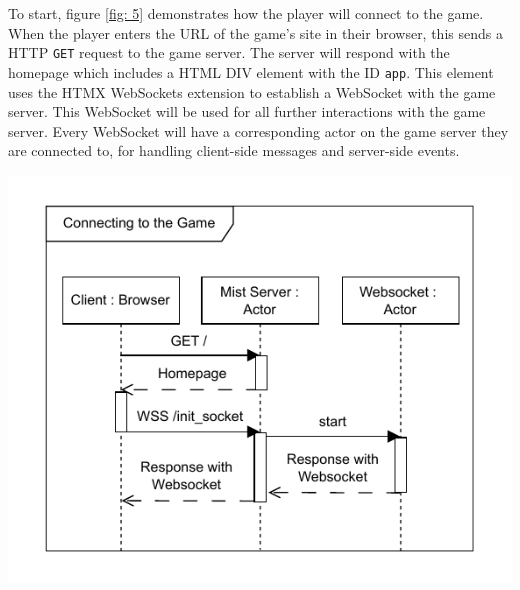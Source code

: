 \documentclass[]{final}
\begin{document}
\noindent
\begin{minipage}[t]{18em}
  \vspace*{-6cm}

  To start, figure \ref{fig: 5} demonstrates how the player will connect to the game.
  When the player enters the URL of the game's site in their browser, this sends a HTTP
  \lstinline|GET| request to the game server. The server will respond with the homepage which
  includes a HTML DIV element with the ID \lstinline|app|. This element uses the HTMX WebSockets
  extension to establish a WebSocket with the game server. This WebSocket will be
  used for all further interactions with the game server. Every WebSocket will have a corresponding
  actor on the game server they are connected to, for handling client-side messages and
  server-side events.
\end{minipage}
\hfill
\begin{minipage}[t]{20em}
  \includegraphics[width=\textwidth]{sequence_connecting}
  \label{fig: 5}
\end{minipage}

\newpage
\end{document}
